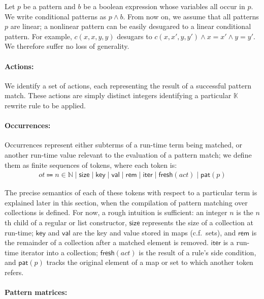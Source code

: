 \documentclass{article}
\theoremstyle{definition}
\newcommand{\K}{$\mathbb{K}$\xspace}
\newcommand{\act}{\mathit{act}}
\newcommand{\siz}{\mathsf{size}}
\newcommand{\rem}{\mathsf{rem}}
\newcommand{\val}{\mathsf{val}}
\newcommand{\key}{\mathsf{key}}
\newcommand{\fsh}{\mathsf{fresh}}
\newcommand{\iter}{\mathsf{iter}}
\newcommand{\pat}{\mathsf{pat}}
\begin{document}
Let $p$ be a pattern and $b$ be a boolean expression whose variables all occur
in $p$. We write conditional patterns as $p \land b$. From now on, we assume
that all patterns $p$ are linear; a nonlinear pattern can be easily desugared to
a linear conditional pattern. For example, $c(x,x,y,y)$ desugars to
$c(x,x',y,y') \land x=x' \land y=y'$. We therefore suffer no loss of generality.

\paragraph{Actions:}

We identify a set of actions, each representing the result of a successful
pattern match. These actions are simply distinct integers identifying a
particular \K rewrite rule to be applied.

\paragraph{Occurrences:}

Occurrences represent either subterms of a run-time term being matched, or
another run-time value relevant to the evaluation of a pattern match; we define
them as finite sequences of tokens, where each token is:
\begin{align*}
  ot \Coloneqq n \in \mathbb{N} \mid \siz \mid \key \mid \val \mid \rem \mid \iter \mid \fsh(\act) \mid \pat(p)
\end{align*}

The precise semantics of each of these tokens with respect to a particular term
is explained later in this section, when the compilation of pattern matching
over collections is defined. For now, a rough intuition is sufficient: an
integer $ n $ is the $ n $th
child of a regular or list constructor,
$\siz$ represents the size of a collection at run-time; $ \key $ and $ \val $
are the key and value stored in maps (c.f.\ sets), and $ \rem $ is the remainder
of a collection after a matched element is removed. $ \iter $ is a run-time
iterator into a collection; $ \fsh(\act) $ is the result of a rule's side
condition, and $ \pat(p) $ tracks the original element of a map or set to which
another token refers.

\paragraph{Pattern matrices:}
\end{document}
